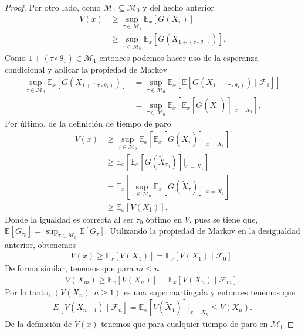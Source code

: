 \begin{proof}
Por otro lado, como $\mathcal{M}_1 \subseteq \mathcal{M}_0$ y del hecho anterior
	\begin{align*}
	V(x) & \geq \sup_{\tau \in \mathcal{M}_1} \mathbb{E}_x [G(X_\tau)] \\
	& \geq \sup_{\tau \in \mathcal{M}_0} \mathbb{E}_x [G(X_{1+ (\tau \circ \theta_1)})].
	\end{align*}
Como $1+ (\tau \circ \theta_1) \in \mathcal{M}_1$ entonces podemos hacer uso de la esperanza condicional y aplicar la propiedad de Markov
	\begin{align*}
	\sup_{\tau \in \mathcal{M}_0} \mathbb{E}_x [G(X_{1+ (\tau \circ \theta_1)})] & = \sup_{\tau \in \mathcal{M}_0} \mathbb{E}_x[\mathbb{E}[G(X_{1+ (\tau \circ \theta_1)}) \mid \mathcal{F}_1]] \\
	& = \sup_{\tau \in \mathcal{M}_0} \mathbb{E}_x \left[ \mathbb{E}_x [G(\tilde{X}_\tau)] \bigg|_{x= X_1} \right].
	\end{align*}
Por último, de la definición de tiempo de paro
	\begin{align*}
	V (x) & \geq \sup_{\tau \in \mathcal{M}_0} \mathbb{E}_x \left[ \mathbb{E}_x [G(\tilde{X}_\tau)] \bigg|_{x= X_1} \right] \\
	& \geq \mathbb{E}_x \left[ \mathbb{E}_x [G(\tilde{X}_{\tau_0})]\bigg|_{x= X_1} \right] \\
	& = \mathbb{E}_x \left[ \sup_{\tau \in \mathcal{M}_0} \mathbb{E}_x[ G(\tilde{X}_\tau)]  \bigg|_{x= X_1} \right] \\
	& \geq \mathbb{E}_x [V(X_1)].
	\end{align*}
Donde la igualdad es correcta al ser $\tau_0$ óptimo en $V$, pues se tiene que, $\mathbb{E}[G_{\tau_0}] = \sup_{\tau \in \mathcal{M}_0} \mathbb{E}[G_{\tau}]$. Utilizando la propiedad de Markov en la desigualdad anterior, obtenemos 
	\begin{align*}
	V (x) \geq \mathbb{E}_x [V(X_1)] = \mathbb{E}_x [V(X_1) \mid \mathcal{F}_0].
	\end{align*}
De forma similar, tenemos que para $m \leq n$
	\begin{align*}
	V(X_m) \geq \mathbb{E}_x [V(X_n)] = \mathbb{E}_x [V(X_n) \mid \mathcal{F}_m].
	\end{align*}
Por lo tanto, $(V(X_n) : n \geq 1)$ es una supermartingala y entonces tenemos que
	\begin{align}
	E[V(X_{n+1}) \mid \mathcal{F}_n] = \mathbb{E}_x [V(\tilde{X}_1)] \bigg|_{x = X_n} \leq V(X_n). \label{abq}
	\end{align}
De la definición de $V(x)$ tenemos que para cualquier tiempo de paro en $\mathcal{M}_1$

\end{proof}
